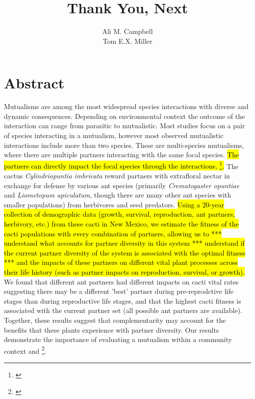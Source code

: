 \documentclass[12pt,a4paper]{article}
\title{Thank You, Next}
\author{Ali M. Campbell\\
	Tom E.X. Miller}
\newcommand{\tom}[2]{{\color{red}{#1}}\footnote{\textit{\color{red}{#2}}}}
\begin{document}
	\maketitle
	
	\section*{Abstract}

Mutualisms are among the most widespread species interactions with diverse and dynamic consequences.
Depending on environmental context the outcome of the interaction can range from parasitic to mutualistic. 
Most studies focus on a pair of species interacting in a mutualism, however most observed mutualistic interactions include more than two species. 
These are multi-species mutualisms, where there are multiple partners interacting with the same focal species. 
\hl{The partners can directly impact the focal species through the interactions, \tom{and indirectly impact them through interactions with each other}{***This is true but not something we are well poised to address with our data so might be risky to bring it up.***}. }
The cactus \textit{Cylindriopuntia imbricata} reward partners with extrafloral nectar in exchange for defense by various ant species (primarily \textit{Crematogaster opuntiae} and \textit{Liometopum apiculatum}, though there are many other ant species with smaller populations) from herbivores and seed predators. 
\hl{Using a 20-year collection of demographic data (growth, survival, reproduction, ant partners, herbivory, etc.) from these cacti in New Mexico, we estimate the fitness of the cacti populations with every combination of partners, allowing us to *** understand what accounts for partner diversity in this system *** understand if the current partner diversity of the system is associated with the optimal fitness *** and the impacts of these partners on different vital plant processes across their life history (such as partner impacts on reproduction, survival, or growth). }
We found that different ant partners had different impacts on cacti vital rates suggesting there may be a different 'best' partner during pre-reprodctive life stages than during reproductive life stages, and that the highest cacti fitness is associated with the current partner set (all possible ant partners are available).
Together, these results suggest that complementarity may account for the benefits that these plants experience with partner diversity. 
Our results demonstrate the importance of evaluating a mutualism within a community context and \tom{suggest that even slight differences of rewards between mutualist partners can help promote fitness of the cacti}{Nothing you have reported in the abstract so far really supports this statement.}. 
\end{document}
